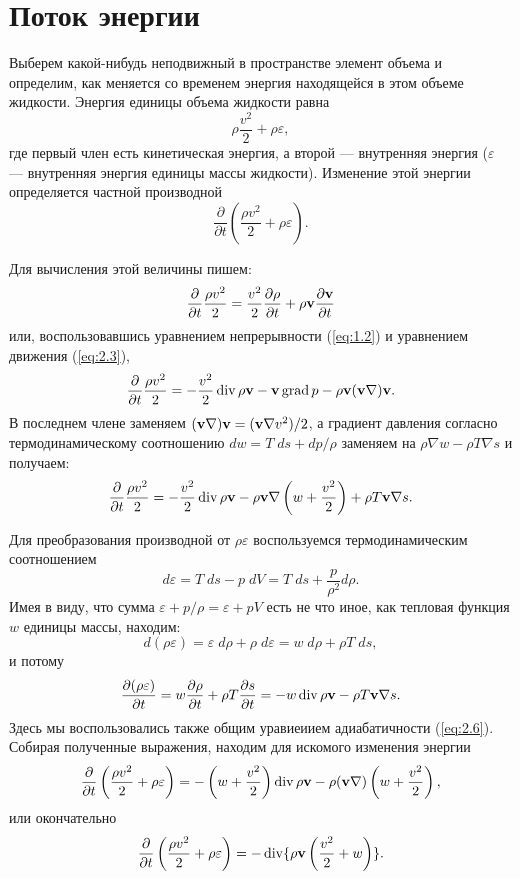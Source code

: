 \section{Поток энергии}
\label{sec:p6}

Выберем какой-нибудь неподвижный в пространстве элемент объема и определим, как
меняется со временем энергия находящейся в этом объеме жидкости. Энергия единицы
объема жидкости равна
\[
   \rho \frac{v^2}{2} + \rho \varepsilon,
\]
где первый член есть кинетическая энергия, а второй — внутренняя энергия
($\varepsilon$ — внутренняя энергия единицы массы жидкости). Изменение этой
энергии определяется частной производной
\[
   \frac{\partial}{\partial t} \left( \frac{\rho v^2}{2}+\rho \varepsilon \right).
\]

Для вычисления этой величины пишем:
\[
   \frac{\partial}{\partial t} \frac{\rho v^2}{2} =
   \frac{v^2}{2}\frac{\partial \rho}{\partial t} +
   \rho \mathbf{v} \frac{\partial { \mathbf{v} }}{\partial t}
\]
или, воспользовавшись уравнением непрерывности (\ref{eq:1.2}) и уравнением движения (\ref{eq:2.3}),
\[
   \frac{\partial}{\partial t}\frac{\rho v^2}{2} = - \frac{v^2}{2}\mathop{\mathrm{div}}\nolimits{\rho { \mathbf{v} }}
   - {\mathbf{v}} \mathop{\mathrm{grad}}\nolimits p - \rho { \mathbf{v} } ({\mathbf{v}} \nabla) {\mathbf{v}}.
\]
В последнем члене заменяем $({\mathbf{v}} \nabla) {\mathbf{v}}=({\mathbf{v}} \nabla v^2)/2$, а градиент давления
согласно термодинамическому соотношению $dw = T\;ds+dp/\rho$ заменяем на $\rho
\nabla w - \rho T \nabla s$ и получаем:
\[
   \frac{\partial}{\partial t}\frac{\rho v^2}{2} = - \frac{v^2}{2}\mathop{\mathrm{div}}\nolimits{\rho { \mathbf{v} }}
   -\rho { \mathbf{v} } \nabla \left(w + \frac{v^2}{2}\right) + \rho T {\mathbf{v}} \nabla s.
\]

Для преобразования производной от $\rho \varepsilon$ воспользуемся
термодинамическим соотношением
\[
   d \varepsilon = T\; ds - p\; dV = T\; ds + \frac{p}{\rho^2}d\rho.
\]
Имея в виду, что сумма $\varepsilon + p/\rho = \varepsilon + pV$ есть не
что иное, как тепловая функция $w$ единицы массы, находим:
\[
   d(\rho \varepsilon) = \varepsilon\;d\rho + \rho\; d\varepsilon =
   w\; d\rho + \rho T\; ds,
\]
и потому
\[
   \frac{\partial{(\rho\varepsilon)}}{\partial{t}} = w \frac{\partial{\rho}}{\partial{t}}+\rho T \frac{\partial{s}}{\partial{t}}
   = - w \mathop{\mathrm{div}}\nolimits \rho { \mathbf{v} } - \rho T {\mathbf{v}} \nabla s.
\]
Здесь мы воспользовались также общим уравиеиием адиабатичности (\ref{eq:2.6}).
Собирая полученные выражения, находим для искомого изменения энергии
\[
   \frac{\partial}{\partial t}\left(\frac{\rho v^2}{2}+\rho\varepsilon\right) =
   -\left(w + \frac{v^2}{2}\right)\mathop{\mathrm{div}}\nolimits{\rho{ \mathbf{v} }} - \rho ({\mathbf{v}} \nabla)
   \left(w + \frac{v^2}{2}\right),
\]
или окончательно
\begin{equation}
   \label{eq:6.1}
   \frac{\partial}{\partial t} \left( \frac{\rho v^2}{2}+ \rho \varepsilon \right) =
   - \mathop{\mathrm{div}}\nolimits \lbrace \rho { \mathbf{v} } \left( \frac{v^2}{2}+w \right) \rbrace.
\end{equation}

